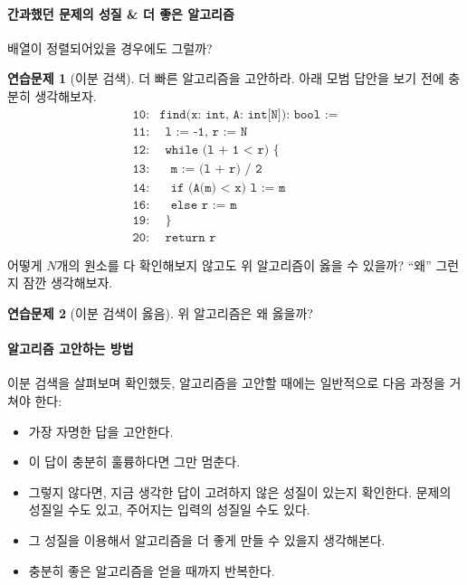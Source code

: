 \documentclass{oblivoir}
\theoremstyle{definition}
\newtheorem{exercise}{연습문제}
\begin{document}
\paragraph{간과했던 문제의 성질 \& 더 좋은 알고리즘}
배열이 정렬되어있을 경우에도 그럴까?
\begin{exercise}[이분 검색]
  더 빠른 알고리즘을 고안하라.  아래 모범 답안을 보기 전에 충분히
  생각해보자.
  \begin{align*}
    \texttt{10:}& \texttt{find(x: int, A: int[N]): bool :=} \\
    \texttt{11:}& \ \ \texttt{l := -1, r := N} \\
    \texttt{12:}& \ \ \texttt{while (l + 1 < r) \{} \\
    \texttt{13:}& \ \ \ \ \texttt{m := (l + r) / 2} \\
    \texttt{14:}& \ \ \ \ \texttt{if (A(m) < x) l := m} \\
    \texttt{16:}& \ \ \ \ \texttt{else r := m} \\
    \texttt{19:}& \ \ \texttt{\}} \\
    \texttt{20:}& \ \ \texttt{return r}
  \end{align*}
\end{exercise}

어떻게 $N$개의 원소를 다 확인해보지 않고도 위 알고리즘이 옳을 수
있을까?  ``왜'' 그런지 잠깐 생각해보자.

\begin{exercise}[이분 검색이 옳음]
  위 알고리즘은 왜 옳을까?
\end{exercise}

\paragraph{알고리즘 고안하는 방법}
이분 검색을 살펴보며 확인했듯, 알고리즘을 고안할 때에는 일반적으로 다음
과정을 거쳐야 한다:
\begin{itemize}
\item 가장 자명한 답을 고안한다.
\item 이 답이 충분히 훌륭하다면 그만 멈춘다.
\item 그렇지 않다면, 지금 생각한 답이 고려하지 않은 성질이 있는지
  확인한다.  문제의 성질일 수도 있고, 주어지는 입력의 성질일 수도
  있다.
\item 그 성질을 이용해서 알고리즘을 더 좋게 만들 수 있을지 생각해본다.
\item 충분히 좋은 알고리즘을 얻을 때까지 반복한다.
\end{itemize}
\end{document}
